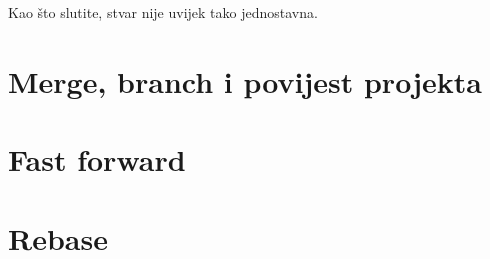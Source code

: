 Kao što slutite, stvar nije uvijek tako jednostavna.

\section*{Merge, branch i povijest projekta}

\section*{Fast forward}

\section*{Rebase}



